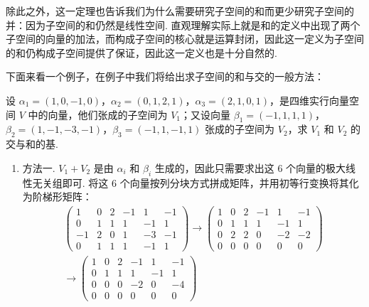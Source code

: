 除此之外，这一定理也告诉我们为什么需要研究子空间的和而更少研究子空间的并：因为子空间的和仍然是线性空间. 直观理解实际上就是和的定义中出现了两个子空间的向量的加法，而构成子空间的核心就是运算封闭，因此这一定义为子空间的和仍构成子空间提供了保证，因此这一定义也是十分自然的.

下面来看一个例子，在例子中我们将给出求子空间的和与交的一般方法：
\begin{example}{}{}
    设 $\alpha_1 = (1, 0, -1, 0)$，$\alpha_2 = (0, 1, 2, 1)$，$\alpha_3 = (2, 1, 0, 1)$，是四维实行向量空间 $V$ 中的向量，他们张成的子空间为 $V_1$；又设向量 $\beta_1 = (-1, 1, 1, 1)$，$\beta_2 = (1, -1, -3, -1)$，$\beta_3 = (-1, 1, -1, 1)$ 张成的子空间为 $V_2$，求 $V_1$ 和 $V_2$ 的交与和的基.
\end{example}

\begin{solution}
    \begin{enumerate}
        \item 方法一.  $V_1 +V_2$ 是由 $\alpha_i$ 和 $\beta_i$ 生成的，因此只需要求出这 $6$ 个向量的极大线性无关组即可. 将这 $6$ 个向量按列分块方式拼成矩阵，并用初等行变换将其化为阶梯形矩阵：
              \begin{align*}
                  \begin{pmatrix}
                      1  & 0 & 2 & -1 & 1  & -1 \\
                      0  & 1 & 1 & 1  & -1 & 1  \\
                      -1 & 2 & 0 & 1  & -3 & -1 \\
                      0  & 1 & 1 & 1  & -1 & 1
                  \end{pmatrix}
                  \xrightarrow{}
                  \begin{pmatrix}
                      1 & 0 & 2 & -1 & 1  & -1 \\
                      0 & 1 & 1 & 1  & -1 & 1  \\
                      0 & 2 & 2 & 0  & -2 & -2 \\
                      0 & 0 & 0 & 0  & 0  & 0
                  \end{pmatrix} \\
                  \xrightarrow{}
                  \begin{pmatrix}
                      1 & 0 & 2 & -1 & 1  & -1 \\
                      0 & 1 & 1 & 1  & -1 & 1  \\
                      0 & 0 & 0 & -2 & 0  & -4 \\
                      0 & 0 & 0 & 0  & 0  & 0
                  \end{pmatrix}
              \end{align*}


\end{enumerate}
\end{solution}
